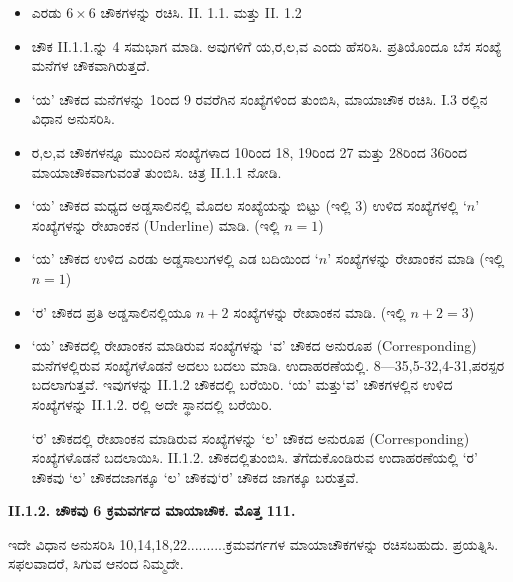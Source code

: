 \begin{itemize}
	\item ಎರಡು $6 \times 6$ ಚೌಕಗಳನ್ನು ರಚಿಸಿ. II. 1.1. ಮತ್ತು II. 1.2
	\item ಚೌಕ II.1.1.ನ್ನು 4 ಸಮಭಾಗ ಮಾಡಿ. ಅವುಗಳಿಗೆ ಯ,ರ,ಲ,ವ ಎಂದು ಹೆಸರಿಸಿ. ಪ್ರತಿಯೊಂದೂ ಬೆಸ ಸಂಖ್ಯೆ ಮನೆಗಳ ಚೌಕವಾಗಿರುತ್ತದೆ.
	\item ‘ಯ’ ಚೌಕದ ಮನೆಗಳನ್ನು 1ರಿಂದ 9 ರವರೆಗಿನ ಸಂಖ್ಯೆಗಳಿಂದ ತುಂಬಿಸಿ, ಮಾಯಾಚೌಕ ರಚಿಸಿ. I.3 ರಲ್ಲಿನ ವಿಧಾನ ಅನುಸರಿಸಿ.
	\item ರ,ಲ,ವ ಚೌಕಗಳನ್ನೂ ಮುಂದಿನ ಸಂಖ್ಯೆಗಳಾದ 10ರಿಂದ 18, 19ರಿಂದ 27 ಮತ್ತು 28ರಿಂದ 36ರಿಂದ ಮಾಯಾಚೌಕವಾಗುವಂತೆ ತುಂಬಿಸಿ. ಚಿತ್ರ II.1.1 ನೋಡಿ.
	\item ‘ಯ’ ಚೌಕದ ಮಧ್ಯದ ಅಡ್ಡಸಾಲಿನಲ್ಲಿ ಮೊದಲ ಸಂಖ್ಯೆಯನ್ನು ಬಿಟ್ಟು (ಇಲ್ಲಿ 3) ಉಳಿದ ಸಂಖ್ಯೆಗಳಲ್ಲಿ $‘n’$ ಸಂಖ್ಯೆಗಳನ್ನು ರೇಖಾಂಕನ (Underline) ಮಾಡಿ. (ಇಲ್ಲಿ $n=1$)
	\item ‘ಯ’ ಚೌಕದ ಉಳಿದ ಎರಡು ಅಡ್ಡಸಾಲುಗಳಲ್ಲಿ ಎಡ ಬದಿಯಿಂದ $‘n’$ ಸಂಖ್ಯೆ\-ಗಳನ್ನು ರೇಖಾಂಕನ ಮಾಡಿ (ಇಲ್ಲಿ $n=1$)
	\item ‘ರ’ ಚೌಕದ ಪ್ರತಿ ಅಡ್ಡಸಾಲಿನಲ್ಲಿಯೂ $n+2$ ಸಂಖ್ಯೆಗಳನ್ನು ರೇಖಾಂಕನ ಮಾಡಿ. (ಇಲ್ಲಿ $n+2=3$)
	\item ‘ಯ’ ಚೌಕದಲ್ಲಿ ರೇಖಾಂಕನ ಮಾಡಿರುವ ಸಂಖ್ಯೆಗಳನ್ನು ‘ವ’ ಚೌಕದ ಅನುರೂಪ (Corresponding) ಮನೆಗಳಲ್ಲಿರುವ ಸಂಖ್ಯೆಗಳೊಡನೆ ಅದಲು ಬದಲು ಮಾಡಿ. ಉದಾಹರಣೆಯಲ್ಲಿ. 8---35,5-32,4-31,ಪರಸ್ಪರ ಬದಲಾಗುತ್ತವೆ. ಇವುಗಳನ್ನು II.1.2 ಚೌಕದಲ್ಲಿ ಬರೆಯಿರಿ. ‘ಯ’ ಮತ್ತು‘ವ’ ಚೌಕಗಳಲ್ಲಿನ ಉಳಿದ ಸಂಖ್ಯೆಗಳನ್ನು II.1.2. ರಲ್ಲಿ ಅದೇ ಸ್ಥಾನದಲ್ಲಿ ಬರೆಯಿರಿ.

	‘ರ’ ಚೌಕದಲ್ಲಿ ರೇಖಾಂಕನ ಮಾಡಿರುವ ಸಂಖ್ಯೆಗಳನ್ನು ‘ಲ’ ಚೌಕದ ಅನುರೂಪ (Corresponding) ಸಂಖ್ಯೆಗಳೊಡನೆ ಬದಲಾಯಿಸಿ. II.1.2. ಚೌಕದಲ್ಲಿ\break ತುಂಬಿಸಿ. ತೆಗೆದುಕೊಂಡಿರುವ ಉದಾಹರಣೆಯಲ್ಲಿ ‘ರ’ ಚೌಕವು ‘ಲ’ ಚೌಕದ\break ಜಾಗಕ್ಕೂ ‘ಲ’ ಚೌಕವು‘ರ’ ಚೌಕದ ಜಾಗಕ್ಕೂ ಬರುತ್ತವೆ.
\end{itemize}

\textbf{II.1.2. ಚೌಕವು 6 ಕ್ರಮವರ್ಗದ ಮಾಯಾಚೌಕ. ಮೊತ್ತ 111.}

ಇದೇ ವಿಧಾನ ಅನುಸರಿಸಿ 10,14,18,22..........ಕ್ರಮವರ್ಗಗಳ ಮಾಯಾಚೌಕ\-ಗಳನ್ನು ರಚಿಸಬಹುದು. ಪ್ರಯತ್ನಿಸಿ. ಸಫಲವಾದರೆ, ಸಿಗುವ ಆನಂದ ನಿಮ್ಮದೇ.

